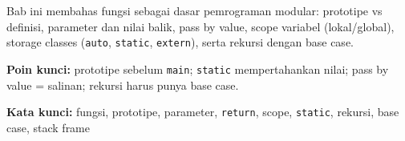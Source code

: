 \documentclass[../main.tex]{subfiles}
\begin{document}
\begin{rangkuman}
Bab ini membahas fungsi sebagai dasar pemrograman modular: prototipe vs definisi, parameter dan nilai balik, pass by value, scope variabel (lokal/global), storage classes (\texttt{auto}, \texttt{static}, \texttt{extern}), serta rekursi dengan base case.

\textbf{Poin kunci:} prototipe sebelum \texttt{main}; \texttt{static} mempertahankan nilai; pass by value = salinan; rekursi harus punya base case.

\textbf{Kata kunci:} fungsi, prototipe, parameter, \texttt{return}, scope, \texttt{static}, rekursi, base case, stack frame
\end{rangkuman}
\end{document}
